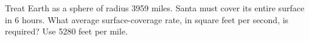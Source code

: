 Treat Earth as a sphere of radius 3959 miles. Santa must cover its entire surface in 6 hours. What average surface-coverage rate, in square feet per second, is required? Use 5280 feet per mile.
